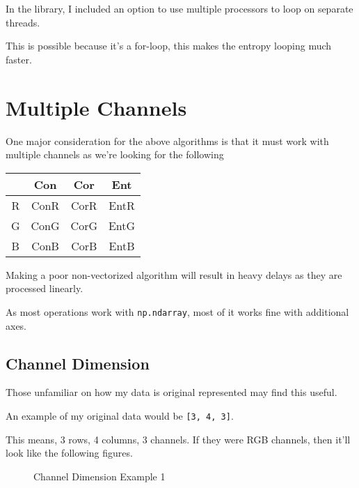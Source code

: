 \documentclass[article,oneside]{memoir}
\begin{document}
In the library, I included an option to use multiple processors to loop on separate threads.

This is possible because it's a for-loop, this makes the entropy looping much faster.

\section{Multiple Channels}

One major consideration for the above algorithms is that it must work with multiple channels as we're looking for the following 

\begin{center}
\begin{tabular}{ |c|c|c|c| } 
 \hline   & Con  & Cor  & Ent  \\ 
 \hline R & ConR & CorR & EntR \\
 \hline G & ConG & CorG & EntG \\
 \hline B & ConB & CorB & EntB \\
 \hline
\end{tabular}
\end{center} 

Making a poor non-vectorized algorithm will result in heavy delays as they are processed linearly.

As most operations work with \verb+np.ndarray+, most of it works fine with additional axes.

\subsection{Channel Dimension}

Those unfamiliar on how my data is original represented may find this useful.

An example of my original data would be \verb+[3, 4, 3]+.

This means, 3 rows, 4 columns, 3 channels.
If they were RGB channels, then it'll look like the following figures.

\begin{figure}[H]
\centering
{}
\caption{Channel Dimension Example 1}
\label{Channel Dimension Example 1}
\end{figure}
\end{document}
